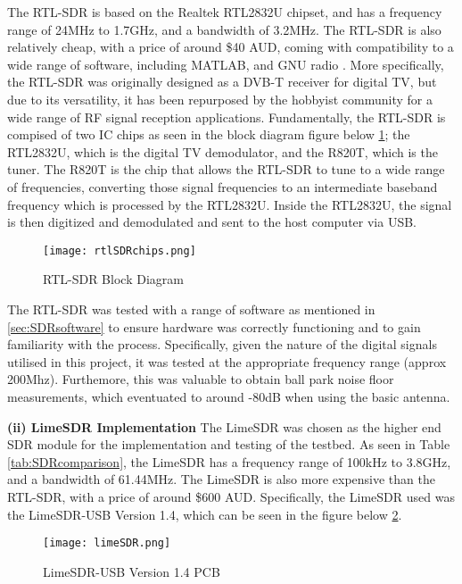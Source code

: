 The RTL-SDR is based on the Realtek RTL2832U chipset, and has a frequency range of 24MHz to 1.7GHz, and a bandwidth of 3.2MHz. The RTL-SDR is also relatively cheap, with a price of around \$40 AUD, coming with compatibility to a wide range of software, including MATLAB, and GNU radio \cite{SDRdongle}. More specifically, the RTL-SDR was originally designed as a DVB-T receiver for digital TV, but due to its versatility, it has been repurposed by the hobbyist community for a wide range of RF signal reception applications. Fundamentally, the RTL-SDR is compised of two IC chips as seen in the block diagram figure below \ref*{fig:rtlSDRblock}; the RTL2832U, which is the digital TV demodulator, and the R820T, which is the tuner. The R820T is the chip that allows the RTL-SDR to tune to a wide range of frequencies, converting those signal frequencies to an intermediate baseband frequency which is processed by the RTL2832U. Inside the RTL2832U, the signal is then digitized and demodulated and sent to the host computer via USB.

\begin{figure}[htbp]
    \centering
    \texttt{[image: rtlSDRchips.png]}
    \caption{RTL-SDR Block Diagram \cite{RTLsdrBlockDiagram}}
    \label{fig:rtlSDRblock}
\end{figure}

\par \noindent
The RTL-SDR was tested with a range of software as mentioned in \ref*{sec:SDRsoftware} to ensure hardware was correctly functioning and to gain familiarity with the process. Specifically, given the nature of the digital signals utilised in this project, it was tested at the appropriate frequency range (approx 200Mhz). Furthemore, this was valuable to obtain ball park noise floor measurements, which eventuated to around -80dB when using the basic antenna. 

\vspace{0.5cm} \noindent 
\textbf{(ii) LimeSDR Implementation}
The LimeSDR was chosen as the higher end SDR module for the implementation and testing of the testbed. As seen in Table \ref{tab:SDRcomparison}, the LimeSDR has a frequency range of 100kHz to 3.8GHz, and a bandwidth of 61.44MHz. The LimeSDR is also more expensive than the RTL-SDR, with a price of around \$600 AUD. Specifically, the LimeSDR used was the LimeSDR-USB Version 1.4, which can be seen in the figure below \ref{fig:limeSDR}. 

\begin{figure}[htbp]
    \centering
    \texttt{[image: limeSDR.png]}
    \caption{LimeSDR-USB Version 1.4 PCB \cite{limesdr_usb}}
    \label{fig:limeSDR}
\end{figure}

